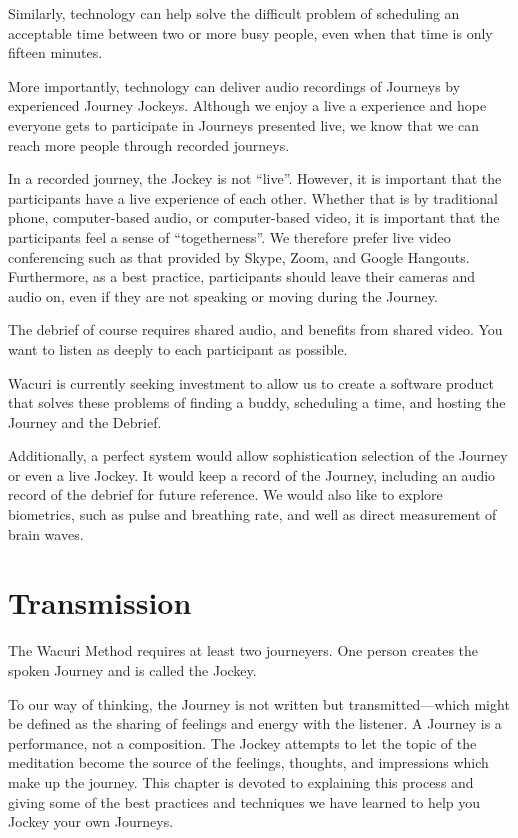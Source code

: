 \documentclass[12pt]{book}
\begin{document}
Similarly, technology can help solve the difficult problem of scheduling an
acceptable time between two or more busy people, even when that time is only fifteen minutes.

More importantly, technology can deliver audio recordings of Journeys by
experienced Journey Jockeys. Although we enjoy a live a experience and hope
everyone gets to participate in Journeys presented live, we know that we
can reach more people through recorded journeys.

In a recorded journey, the Jockey is not ``live''. However, it is
important that the participants have a live experience of each other.
Whether that is by traditional phone, computer-based audio, or computer-based
video, it is important that the participants feel a sense of ``togetherness''.
We therefore prefer live video conferencing such as that provided by Skype,
Zoom, and Google Hangouts. Furthermore, as a best practice, participants
should leave their cameras and audio on, even if they are not speaking or
moving during the Journey.

The debrief of course requires shared audio, and benefits from shared video.
You want to listen as deeply to each participant as possible.

Wacuri is currently seeking investment to allow us to create a software
product that solves these problems of finding a buddy, scheduling a time,
and hosting the Journey and the Debrief.

Additionally, a perfect system would allow sophistication selection of
the Journey or even a live Jockey. It would keep a record of the Journey,
including an audio record of the debrief for future reference. We would
also like to explore biometrics, such as pulse and breathing rate, and
well as direct measurement of brain waves.


\chapter{Transmission}


The Wacuri Method requires at least two journeyers. One person creates the spoken Journey and is called the Jockey.
					
To our way of thinking, the Journey is not written but transmitted---which
might be defined as the sharing of feelings and energy with the listener. A Journey is a performance, not a composition.
The Jockey attempts to let the topic of the meditation become the source of the feelings, thoughts,
and impressions which make up the journey.
This chapter is devoted to explaining this process and giving some of the best practices
and techniques we have learned to help you Jockey your own Journeys.
					
\end{document}
